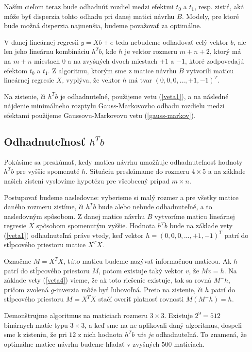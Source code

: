 Naším cieľom teraz bude odhadnúť rozdiel medzi efektmi $t_0$ a $t_1$, resp. zistiť, 
aká môže byť disperzia tohto odhadu pri danej matici návrhu $B$. 
Modely, pre ktoré bude možná disperzia najmenšia, budeme považovať za optimálne.

V danej lineárnej regresii $y = X b + e$ teda nebudeme odhadovať celý vektor $b$, 
ale len jeho lineárnu kombináciu $h^T b$, kde $h$ je vektor rozmeru $m + n + 2$, 
ktorý má na $m + n$ miestach $0$ a na zvyšných dvoch miestach $+1$ a $-1$, ktoré zodpovedajú efektom $t_0$ a $t_1$. 
Z algoritmu, ktorým sme z matice návrhu $B$ vytvorili maticu lineárnej regresie $X$, 
vyplýva, že vektor $h$ má tvar $(0, 0, 0, \ldots, +1, -1)^T$.

Na zistenie, či $h^T b$ je odhadnuteľné, použijeme vetu (\ref{veta1}), 
a na následné nájdenie minimálneho rozptylu Gauss-Markovovho odhadu rozdielu medzi efektami 
použijeme Gaussovu-Markovovu vetu (\ref{gauss-markov}).

\subsection{Odhadnuteľnosť $h^T b$}

Pokúsime sa preskúmať, kedy matica návrhu umožňuje odhadnuteľnosť hodnoty $h^T b$ pre vyššie spomenuté $h$. 
Situáciu preskúmame do rozmeru $4 \times 5$ a na základe našich zistení vyslovíme hypotézu pre všeobecný prípad $m \times n$.

Postupovať budeme nasledovne: vyberieme si malý rozmer a pre všetky matice daného rozmeru zistíme, 
či $h^T b$ bude alebo nebude odhadnuteľné, a to nasledovným spôsobom. 
Z danej matice návrhu $B$ vytvoríme maticu lineárnej regresie $X$ spôsobom spomenutým vyššie. 
Hodnota $h^T b$ bude na základe vety (\ref{veta1}) odhadnuteľná práve vtedy, 
keď vektor $h = (0, 0, 0, \ldots, +1, -1)^T$ patrí do stĺpcového priestoru matice $X^T X$.

Označme $M = X^T X$, túto maticu budeme nazývať informačnou maticou. 
Ak $h$ patrí do stĺpcového priestoru $M$, potom existuje taký vektor $v$, že $M v = h$. 
Na základe vety (\ref{veta4}) vieme, že ak toto riešenie existuje, tak sa rovná $M^- h$, pričom zvolená $g$-inverzia môže byť ľubovoľná.
Preto na zistenie, či $h$ patrí do stĺpcového priestoru $M = X^T X$ stačí overiť platnosť rovnosti $M(M^- h) = h$. 

Demonštrujme algoritmus na maticiach rozmeru $3 \times 3$. Existuje $2^9 = 512$ binárnych matíc typu $3 \times 3$, 
a keď sme na ne aplikovali daný algoritmus, dospeli sme k zisteniu, že pri $12$ z nich hodnota $h^T b$ \emph{nie je} odhadnuteľná.
To znamená, že optimálne matice návrhu budeme hľadať v zvyšných $500$ maticiach.

